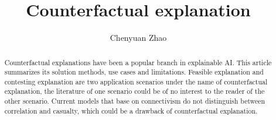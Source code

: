 \documentclass[runningheads]{llncs}
\begin{document}
%
\title{Counterfactual explanation}
%
%
\author{Chenyuan Zhao
}

%
\maketitle              %
%
\begin{abstract}
Counterfactual explanations have been a popular branch in explainable AI. This article summarizes its solution methods, use cases and limitations. Feasible explanation and contesting explanation are two application scenarios under the name of counterfactual explanation, the literature of one scenario could be of no interest to the reader of the other scenario. Current models that base on connectivism do not distinguish between correlation and casualty, which could be a drawback of counterfactual explanation.

\end{abstract}
%


%
%
%
%
%
%
% 
% 
%

{}
\end{document}
